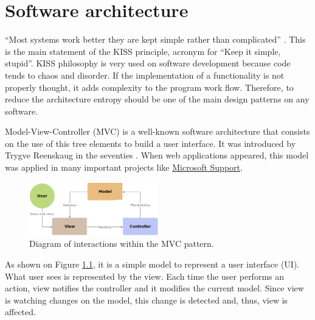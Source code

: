\chapter{Software architecture}
\label{S:architecture}


“Most systems work better they are kept simple rather than complicated”
\cite{kiss-wiki}. This is the main statement of the KISS principle, acronym for
“Keep it simple, stupid”. KISS philosophy is very used on software development
because code tends to chaos and disorder. If the implementation of a
functionality is not properly thought, it adds complexity to the program work
flow. Therefore, to reduce the architecture entropy should be one of the main
design patterns on any software.

Model-View-Controller (MVC) is a well-known software architecture that consists
on the use of this tree elements to build a user interface. It was introduced 
by Trygve Reenskaug in the seventies \cite{mvc-past-present}. When web
applications appeared, this model was applied in many important projects
like \href{https://support.microsoft.com}{Microsoft Support}. 


\begin{figure}[htb]
	\begin{center}
		\includegraphics[width=0.5\textwidth]{./figures/mvc.png}
		\caption{Diagram of interactions within the MVC pattern.
				 \cite{mvc-wiki}}
		\label{F:mvc}
	\end{center}
\end{figure}

As shown on Figure \ref{F:mvc}, it is a simple model to represent a user
interface (UI). What user sees is represented by the view. Each time the user 
performs an action, view notifies the controller and it modifies the current
model. Since view is watching changes on the model, this change is detected and,
thus, view is affected.

